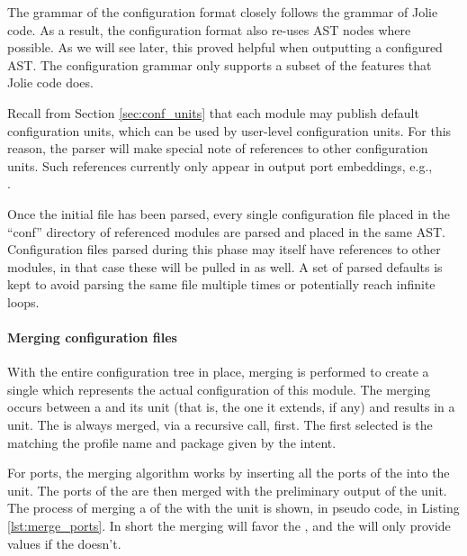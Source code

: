 The grammar of the configuration format closely follows the grammar of Jolie
code. As a result, the configuration format also re-uses AST nodes where
possible. As we will see later, this proved helpful when outputting a
configured AST. The configuration grammar only supports a subset of the
features that Jolie code does.

Recall from Section \ref{sec:conf_units} that each module may publish default
configuration units, which can be used by user-level configuration units. For
this reason, the parser will make special note of references to other
configuration units. Such references currently only appear in output port
embeddings, e.g., \\.

Once the initial file has been parsed, every single configuration file placed
in the ``conf'' directory of referenced modules are parsed and placed in the
same AST. Configuration files parsed during this phase may itself have
references to other modules, in that case these will be pulled in as well.  A
set of parsed defaults is kept to avoid parsing the same file multiple times
or potentially reach infinite loops.

\paragraph{Merging configuration files}

With the entire configuration tree in place, merging is performed to create a
single  which represents the actual configuration of this
module. The merging occurs between a  and its  unit
(that is, the one it extends, if any) and results in a  unit. The
 is always merged, via a recursive call, first. The first
 selected is the  matching the profile name and
package given by the intent.

For ports, the merging algorithm works by inserting all the ports of the
 into the  unit. The ports of the  are
then merged with the preliminary output of the  unit. The
process of merging a  of the  with the 
unit is shown, in pseudo code, in Listing \ref{lst:merge_ports}. In short the
merging will favor the , and the  will only provide
values if the  doesn't.


